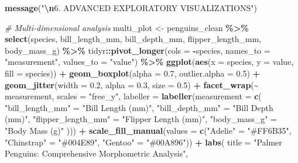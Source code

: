 \documentclass[
]{article}
\newenvironment{Shaded}{\begin{snugshade}}{\end{snugshade}}
\newcommand{\AttributeTok}[1]{\textcolor[rgb]{0.13,0.29,0.53}{#1}}
\newcommand{\CommentTok}[1]{\textcolor[rgb]{0.56,0.35,0.01}{\textit{#1}}}
\newcommand{\FloatTok}[1]{\textcolor[rgb]{0.00,0.00,0.81}{#1}}
\newcommand{\FunctionTok}[1]{\textcolor[rgb]{0.13,0.29,0.53}{\textbf{#1}}}
\newcommand{\NormalTok}[1]{#1}
\newcommand{\OtherTok}[1]{\textcolor[rgb]{0.56,0.35,0.01}{#1}}
\newcommand{\SpecialCharTok}[1]{\textcolor[rgb]{0.81,0.36,0.00}{\textbf{#1}}}
\newcommand{\StringTok}[1]{\textcolor[rgb]{0.31,0.60,0.02}{#1}}
\begin{document}
\begin{Shaded}
\begin{Highlighting}[]
\FunctionTok{message}\NormalTok{(}\StringTok{"}\SpecialCharTok{\textbackslash{}n}\StringTok{6. ADVANCED EXPLORATORY VISUALIZATIONS"}\NormalTok{)}

\CommentTok{\# Multi{-}dimensional analysis}
\NormalTok{multi\_plot }\OtherTok{\textless{}{-}}\NormalTok{ penguins\_clean }\SpecialCharTok{\%\textgreater{}\%}
  \FunctionTok{select}\NormalTok{(species, bill\_length\_mm, bill\_depth\_mm, flipper\_length\_mm, body\_mass\_g) }\SpecialCharTok{\%\textgreater{}\%}
\NormalTok{  tidyr}\SpecialCharTok{::}\FunctionTok{pivot\_longer}\NormalTok{(}\AttributeTok{cols =} \SpecialCharTok{{-}}\NormalTok{species, }\AttributeTok{names\_to =} \StringTok{"measurement"}\NormalTok{, }\AttributeTok{values\_to =} \StringTok{"value"}\NormalTok{) }\SpecialCharTok{\%\textgreater{}\%}
  \FunctionTok{ggplot}\NormalTok{(}\FunctionTok{aes}\NormalTok{(}\AttributeTok{x =}\NormalTok{ species, }\AttributeTok{y =}\NormalTok{ value, }\AttributeTok{fill =}\NormalTok{ species)) }\SpecialCharTok{+}
  \FunctionTok{geom\_boxplot}\NormalTok{(}\AttributeTok{alpha =} \FloatTok{0.7}\NormalTok{, }\AttributeTok{outlier.alpha =} \FloatTok{0.5}\NormalTok{) }\SpecialCharTok{+}
  \FunctionTok{geom\_jitter}\NormalTok{(}\AttributeTok{width =} \FloatTok{0.2}\NormalTok{, }\AttributeTok{alpha =} \FloatTok{0.3}\NormalTok{, }\AttributeTok{size =} \FloatTok{0.5}\NormalTok{) }\SpecialCharTok{+}
  \FunctionTok{facet\_wrap}\NormalTok{(}\SpecialCharTok{\textasciitilde{}}\NormalTok{ measurement, }\AttributeTok{scales =} \StringTok{"free\_y"}\NormalTok{,}
             \AttributeTok{labeller =} \FunctionTok{labeller}\NormalTok{(}\AttributeTok{measurement =} \FunctionTok{c}\NormalTok{(}
               \StringTok{"bill\_length\_mm"} \OtherTok{=} \StringTok{"Bill Length (mm)"}\NormalTok{,}
               \StringTok{"bill\_depth\_mm"} \OtherTok{=} \StringTok{"Bill Depth (mm)"}\NormalTok{,}
               \StringTok{"flipper\_length\_mm"} \OtherTok{=} \StringTok{"Flipper Length (mm)"}\NormalTok{,}
               \StringTok{"body\_mass\_g"} \OtherTok{=} \StringTok{"Body Mass (g)"}
\NormalTok{             ))) }\SpecialCharTok{+}
  \FunctionTok{scale\_fill\_manual}\NormalTok{(}\AttributeTok{values =} \FunctionTok{c}\NormalTok{(}\StringTok{"Adelie"} \OtherTok{=} \StringTok{"\#FF6B35"}\NormalTok{, }\StringTok{"Chinstrap"} \OtherTok{=} \StringTok{"\#004E89"}\NormalTok{, }\StringTok{"Gentoo"} \OtherTok{=} \StringTok{"\#00A896"}\NormalTok{)) }\SpecialCharTok{+}
  \FunctionTok{labs}\NormalTok{(}
    \AttributeTok{title =} \StringTok{"Palmer Penguins: Comprehensive Morphometric Analysis"}\NormalTok{,}

\end{Highlighting}
\end{Shaded}
\end{document}

